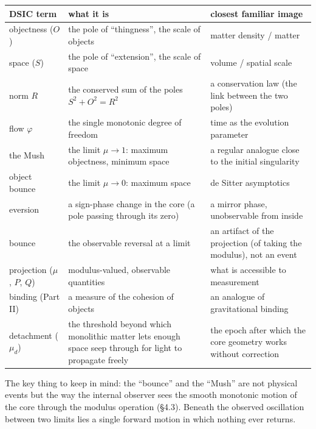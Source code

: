 \documentclass{article}
\begin{document}
\begin{table}[H]
\centering
\small
\begin{tabularx}{\textwidth}{@{}>{\raggedright\arraybackslash}p{}
                               >{\raggedright\arraybackslash}p{}
                               >{\raggedright\arraybackslash}p{}@{}}
\toprule
\textbf{DSIC term} & \textbf{what it is} & \textbf{closest familiar image} \\
\midrule
objectness ($O$) & the pole of ``thingness'', the scale of objects & matter density / matter \\
\addlinespace
space ($S$) & the pole of ``extension'', the scale of space & volume / spatial scale \\
\addlinespace
norm $R$ & the conserved sum of the poles $S^2 + O^2 = R^2$ & a conservation law (the link between the two poles) \\
\addlinespace
flow $\varphi$ & the single monotonic degree of freedom & time as the evolution parameter \\
\addlinespace
the Mush & the limit $\mu \to 1$: maximum objectness, minimum space & a regular analogue close to the initial singularity \\
\addlinespace
object bounce & the limit $\mu \to 0$: maximum space & de Sitter asymptotics \\
\addlinespace
eversion & a sign-phase change in the core (a pole passing through its zero) & a mirror phase, unobservable from inside \\
\addlinespace
bounce & the observable reversal at a limit & an artifact of the projection (of taking the modulus), not an event \\
\addlinespace
projection ($\mu$, $P$, $Q$) & modulus-valued, observable quantities & what is accessible to measurement \\
\addlinespace
binding (Part II) & a measure of the cohesion of objects & an analogue of gravitational binding \\
\addlinespace
detachment ($\mu_d$) & the threshold beyond which monolithic matter lets enough space seep through for light to propagate freely & the epoch after which the core geometry works without correction \\
\bottomrule
\end{tabularx}
\end{table}

The key thing to keep in mind: the ``bounce'' and the ``Mush'' are not physical events but the way the internal observer sees the smooth monotonic motion of the core through the modulus operation (\S4.3). Beneath the observed oscillation between two limits lies a single forward motion in which nothing ever returns.
\end{document}
